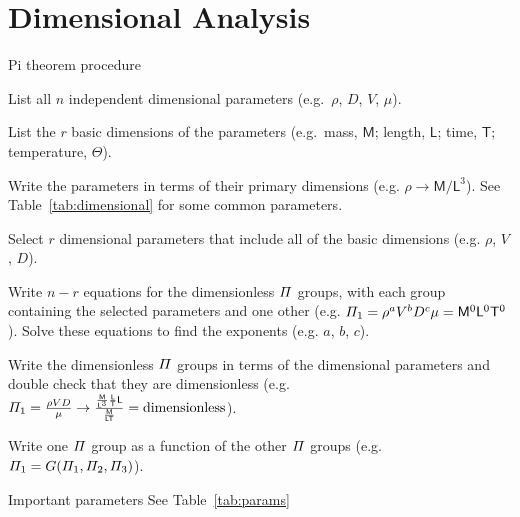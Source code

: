 \documentclass{article}
\begin{document}
\section{Dimensional Analysis}
\begin{description*}
\item[Pi theorem procedure]~
  \begin{enumerate*}
  \item List all $n$ independent dimensional parameters (e.g.\ $\rho$, $D$, $V$, $\mu$).
  \item List the $r$ basic dimensions of the parameters (e.g.\ mass, $\mathsf{M}$; length,
    $\mathsf{L}$; time, $\mathsf{T}$; temperature, $\mathsf{\Theta}$).
  \item Write the parameters in terms of their primary dimensions (e.g. $\rho\rightarrow
    \mathsf{M}/\mathsf{L}^3$).  See Table~\ref{tab:dimensional} for some common parameters.
  \item Select $r$ dimensional parameters that include all of the basic dimensions
    (e.g. $\rho$, $V$, $D$).
  \item Write $n-r$ equations for the dimensionless $\mathnormal\Pi$ groups, with each group
    containing the selected parameters and one other (e.g.
    \(\mathnormal\Pi_1 = \rho^a V^b D^c \mu = \mathsf{M}^0\mathsf{L}^0\mathsf{T}^0\)).
    Solve these equations to find the exponents (e.g. $a$, $b$, $c$).
  \item Write the dimensionless $\mathnormal\Pi$ groups in terms of the dimensional parameters and
    double check that they are dimensionless (e.g. \(\mathnormal\Pi_1 = \frac{\rho{}VD}{\mu}
    \rightarrow \frac{\frac{\mathsf{M}}{\mathsf{L}^3}\frac{\mathsf{L}}{\mathsf{T}}\mathsf{L}}
                     {\frac{\mathsf{M}}{\mathsf{L}\mathsf{T}}}
    = \textrm{dimensionless}\)).
  \item Write one $\mathnormal\Pi$ group as a function of the other $\mathnormal\Pi$ groups
    (e.g. \(\mathnormal\Pi_1 = G(\mathnormal\Pi_1,\mathnormal\Pi_2,\mathnormal\Pi_3)\)).
  \end{enumerate*}
\item[Important parameters] See Table~\ref{tab:params}
\end{description*}
\end{document}
